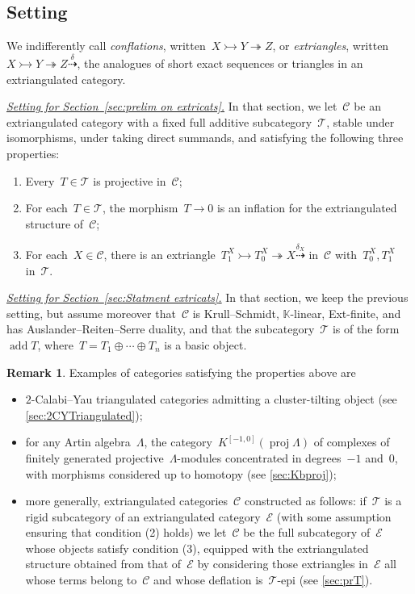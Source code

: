 \documentclass{amsart}
\theoremstyle{definition}
\newtheorem{remark}[theorem]{Remark}
\newcommand{\para}[1]{\medskip\noindent\uline{\textit{#1.}}} %
\newcommand{\field}{\mathbb{K}}
\newcommand{\cat}{\mathcal{C}}
\newcommand{\add}{\operatorname{add}}
\newcommand{\proj}{\operatorname{proj}}
\newcommand{\tc}{\mathcal{T}}
\newcommand{\ec}{\mathcal{E}}
\newcommand{\infl}{\rightarrowtail}
\newcommand{\defl}{\twoheadrightarrow}
\begin{document}

\subsection{Setting}
\label{setting:extricat}

We indifferently call \emph{conflations}, written~$X\infl Y\defl Z$, or \emph{extriangles}, written ${X\infl Y\defl Z \overset{\delta}{\dashrightarrow}}$, the analogues of short exact sequences or triangles in an extriangulated category.

\smallskip
\para{Setting for Section~\ref{sec:prelim on extricats}}
In that section, we let~$\cat$ be an extriangulated category with a fixed full additive subcategory~$\tc$, stable under isomorphisms, under taking direct summands, and satisfying the following three properties:
\begin{enumerate}
\item Every~$T\in\tc$ is projective in~$\cat$;
\item For each~$T\in\tc$, the morphism~$T\to 0$ is an inflation for the extriangulated structure of~$\cat$;
\item For each~$X\in\cat$, there is an extriangle~$T_1^X\infl T_0^X \defl X \overset{\delta_X}{\dashrightarrow}$ in~$\cat$ with~$T_0^X, T_1^X$ in~$\tc$.
\end{enumerate}

\smallskip
\para{Setting for Section~\ref{sec:Statment extricats}}
In that section, we keep the previous setting, but assume moreover that~$\cat$ is Krull--Schmidt, $\field$-linear, Ext-finite, and has Auslander--Reiten--Serre duality, and that the subcategory~$\tc$ is of the form~$\add T$, where~$T=T_1\oplus\cdots\oplus T_n$ is a basic object.

\begin{remark}
\label{rem:examples extricats}
Examples of categories satisfying the properties above are
\begin{itemize}
\item $2$-Calabi--Yau triangulated categories admitting a cluster-tilting object (see \cref{sec:2CYTriangulated});
\item for any Artin algebra~$\Lambda$, the category~$K^{[-1,0]}(\proj \Lambda)$ of complexes of finitely generated projective~$\Lambda$-modules concentrated in degrees~$-1$ and~$0$, with morphisms considered up to homotopy (see \cref{sec:Kbproj});
\item more generally, extriangulated categories~$\cat$ constructed as follows: if~$\tc$ is a rigid subcategory of an extriangulated category~$\ec$ (with some assumption ensuring that condition (2) holds) we let~$\cat$ be the full subcategory of~$\ec$ whose objects satisfy condition (3), equipped with the extriangulated structure obtained from that of~$\ec$ by considering those extriangles in~$\ec$ all whose terms belong to~$\cat$ and whose deflation is~$\tc$-epi (see \cref{sec:prT}).
\end{itemize}
\end{remark}
\end{document}
